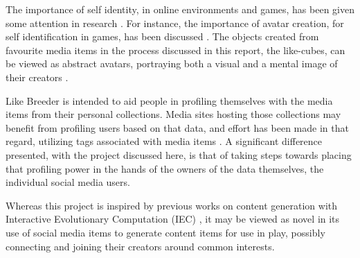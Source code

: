 \documentclass[]{article}
\begin{document}

The importance of self identity, in online environments and games, has been given some attention in research \cite{jones1997virtual,zhao2008identity,slater2002social,kollock2002communities,marwick2005selling,vitak2008facebook}.  For instance, the importance of avatar creation, for self identification in games, has been discussed \cite{waggoner2009my,trepte2010avatar}.  The objects created from favourite media items in the process discussed in this report, the like-cubes, can be viewed as abstract avatars, portraying both a visual and a mental image of their creators \cite{trepte2010avatar}.


Like Breeder is intended to aid people in profiling themselves with the media items from their personal collections.  Media sites hosting those collections may benefit from profiling users based on that data, and effort has been made in that regard, utilizing tags associated with media items \cite{guy2010social,hung2008tag}.  A significant difference presented, with the project discussed here, is that of taking steps towards placing that profiling power in the hands of the owners of the data themselves, the individual social media users.

Whereas this project is inspired by previous works on content generation with Interactive Evolutionary Computation (IEC) \cite{cardamone2011interactive,togelius2007towards,secretan2011picbreeder}, it may be viewed as novel in its use of social media items to generate content items for use in play, possibly connecting and joining their creators around common interests.
\end{document}
